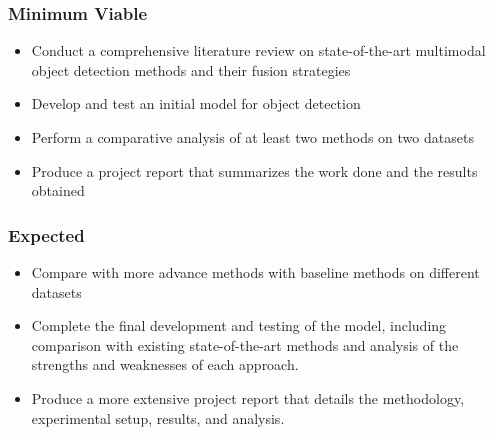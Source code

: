 \documentclass[rnd]{mas_proposal}
\begin{document}
\subsubsection*{Minimum Viable}
\begin{itemize}
    \item Conduct a comprehensive literature review on state-of-the-art multimodal object detection methods and their fusion strategies
    \item Develop and test an initial model for object detection
    \item Perform a comparative analysis of at least two methods on two datasets
    \item Produce a project report that summarizes the work done and the results obtained


\end{itemize}

\subsubsection*{Expected}
\begin{itemize}
    \item Compare with more advance methods with baseline methods on different datasets
    \item  Complete the final development and testing of the model, including comparison with existing state-of-the-art methods and analysis of the strengths and weaknesses of each approach.
    \item Produce a more extensive project report that details the methodology, experimental setup, results, and analysis.
\end{itemize}
\end{document}
